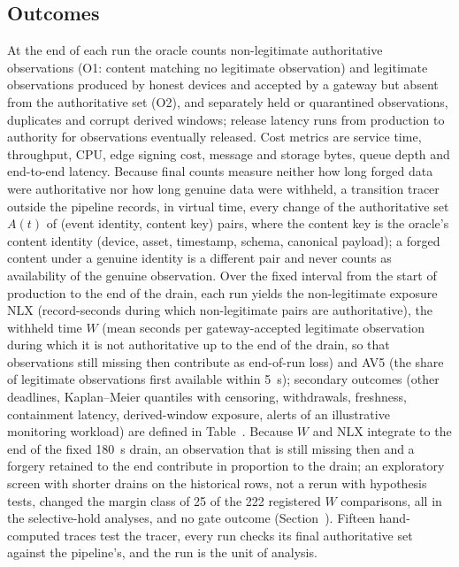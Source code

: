 \subsection{Outcomes}\label{sec:metrics}

At the end of each run the oracle counts non-legitimate authoritative observations (O1: content matching no legitimate observation) and legitimate observations produced by honest devices and accepted by a gateway but absent from the authoritative set (O2), and separately held or quarantined observations, duplicates and corrupt derived windows; release latency runs from production to authority for observations eventually released. Cost metrics are service time, throughput, CPU, edge signing cost, message and storage bytes, queue depth and end-to-end latency. Because final counts measure neither how long forged data were authoritative nor how long genuine data were withheld, a transition tracer outside the pipeline records, in virtual time, every change of the authoritative set $A(t)$ of (event identity, content key) pairs, where the content key is the oracle's content identity (device, asset, timestamp, schema, canonical payload); a forged content under a genuine identity is a different pair and never counts as availability of the genuine observation. Over the fixed interval from the start of production to the end of the drain, each run yields the non-legitimate exposure NLX (record-seconds during which non-legitimate pairs are authoritative), the withheld time $W$ (mean seconds per gateway-accepted legitimate observation during which it is not authoritative up to the end of the drain, so that observations still missing then contribute as end-of-run loss) and AV5 (the share of legitimate observations first available within 5~s); secondary outcomes (other deadlines, Kaplan--Meier quantiles with censoring, withdrawals, freshness, containment latency, derived-window exposure, alerts of an illustrative monitoring workload) are defined in Table~. Because $W$ and NLX integrate to the end of the fixed 180~s drain, an observation that is still missing then and a forgery retained to the end contribute in proportion to the drain; an exploratory screen with shorter drains on the historical rows, not a rerun with hypothesis tests, changed the margin class of 25 of the 222 registered $W$ comparisons, all in the selective-hold analyses, and no gate outcome (Section~). Fifteen hand-computed traces test the tracer, every run checks its final authoritative set against the pipeline's, and the run is the unit of analysis.

